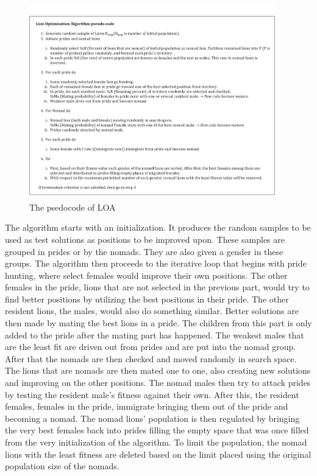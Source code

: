 \begin{figure}[H]
\begin{center}
\includegraphics[width=0.95\textwidth]{img/pseudocode}
\caption{The psedocode of LOA}
\end{center}
\end{figure}

The algorithm starts with an initialization. It produces the random samples to be used as test solutions as positions to be improved upon. These samples are grouped in prides or by the nomads. They are also given a gender in these groups. The algorithm then proceeds to the iterative loop that begins with pride hunting, where select females would improve their own positions. The other females in the pride, lions that are not selected in the previous part, would try to find better positions by utilizing the best positions in their pride. The other resident lions, the males, would also do something similar. Better solutions are then made by mating the best lions in a pride. The children from this part is only added to the pride after the mating part has happened. The weakest males that are the least fit are driven out from prides and are put into the nomad group. After that the nomads are then checked and moved randomly in search space. The lions that are nomads are then mated one to one, also creating new solutions and improving on the other positions. The nomad males then try to attack prides by testing the resident male's fitness against their own. After this, the resident females, females in the pride, immigrate bringing them out of the pride and becoming a nomad. The nomad lions' population is then regulated by bringing the very best females back into prides filling the empty space that was once filled from the very initialization of the algorithm. To limit the population, the nomad lions with the least fitness are deleted based on the limit placed using the original population size of the nomads.


